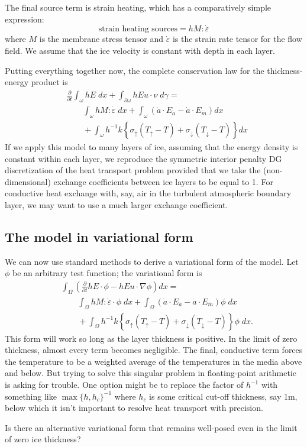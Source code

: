 \documentclass{article}
\theoremstyle{definition}
\theoremstyle{plain}
\begin{document}
The final source term is strain heating, which has a comparatively simple expression:
\begin{equation}
    \text{strain heating sources} = h M : \dot\varepsilon
\end{equation}
where $M$ is the membrane stress tensor and $\dot\varepsilon$ is the strain rate tensor for the flow field.
We assume that the ice velocity is constant with depth in each layer.

Putting everything together now, the complete conservation law for the thickness-energy product is
\begin{align}
    & \frac{\partial}{\partial t}\int_\omega hE\;dx + \int_{\partial\omega}hEu\cdot\nu\;d\gamma = \\
    & \qquad \int_\omega h M:\dot\varepsilon\;dx + \int_\omega\left(\dot a\cdot E_{\dot a} - \dot a\cdot E_{\dot m}\right)dx \\
    & \qquad + \int_\omega h^{-1}k\left\{\sigma_{\uparrow}(T_{\uparrow} - T) + \sigma_{\downarrow}(T_{\downarrow} - T)\right\}dx
\end{align}
If we apply this model to many layers of ice, assuming that the energy density is constant within each layer, we reproduce the symmetric interior penalty DG discretization of the heat transport problem provided that we take the (non-dimensional) exchange coefficients between ice layers to be equal to 1.
For conductive heat exchange with, say, air in the turbulent atmospheric boundary layer, we may want to use a much larger exchange coefficient.


\subsection{The model in variational form}

We can now use standard methods to derive a variational form of the model.
Let $\phi$ be an arbitrary test function; the variational form is
\begin{align}
    & \int_\Omega \left(\frac{\partial}{\partial t}hE\cdot\phi - hEu\cdot\nabla\phi\right)dx = \\
    & \qquad \int_\Omega h M:\dot\varepsilon\cdot\phi\;dx + \int_\Omega\left(\dot a\cdot E_{\dot a} - \dot a\cdot E_{\dot m}\right)\phi\;dx \\
    & \qquad + \int_\Omega h^{-1}k\left\{\sigma_{\uparrow}(T_{\uparrow} - T) + \sigma_{\downarrow}(T_{\downarrow} - T)\right\}\phi\;dx.
\end{align}
This form will work so long as the layer thickness is positive.
In the limit of zero thickness, almost every term becomes negligible.
The final, conductive term forces the temperature to be a weighted average of the temperatures in the media above and below.
But trying to solve this singular problem in floating-point arithmetic is asking for trouble.
One option might be to replace the factor of $h^{-1}$ with something like $\max\{h, h_c\}^{-1}$ where $h_c$ is some critical cut-off thickness, say 1m, below which it isn't important to resolve heat transport with precision.

Is there an alternative variational form that remains well-posed even in the limit of zero ice thickness?


\pagebreak



\end{document}
